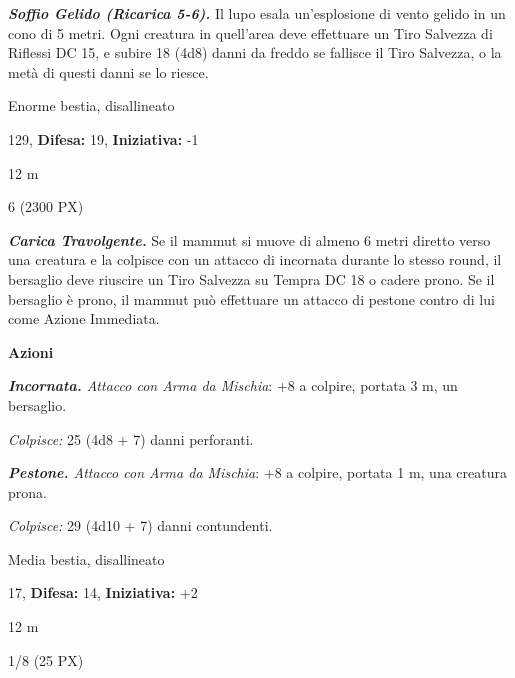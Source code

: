 \begin{multicols}{2}
{\emph{\textbf{Soffio Gelido (Ricarica 5-6).}} Il lupo esala un'esplosione di vento gelido in un cono di 5 metri. Ogni creatura in quell'area deve effettuare un Tiro Salvezza di Riflessi DC 15, e subire 18 (4d8) danni da freddo se fallisce il Tiro Salvezza, o la metà di questi danni se lo riesce.

\begin{description}[noitemsep, topsep=0pt, parsep=0pt, partopsep=0pt, leftmargin=0cm, labelwidth=2.2cm]
    \item[\textbf{Taglia/Tipo:}] Enorme bestia, disallineato
    \item[\textbf{Caratt.:}] 
    \item[\textbf{Punti Ferita:}] 129,  \textbf{Difesa:} 19,  \textbf{Iniziativa:} -1
    \item[\textbf{Tiri Salvez.:}] 
    \item[\textbf{Movimento:}] 12 m
    \item[\textbf{Sfida:}] 6 (2300 PX)\smallskip
\end{description}

\emph{\textbf{Carica Travolgente.}} Se il mammut si muove di almeno 6 metri diretto verso una creatura e la colpisce con un attacco di incornata durante lo stesso round, il bersaglio deve riuscire un Tiro Salvezza su Tempra DC 18 o cadere prono. Se il bersaglio è prono, il mammut può effettuare un attacco di pestone contro di lui come Azione Immediata.

\textbf{Azioni}

\emph{\textbf{Incornata.} Attacco con Arma da Mischia}: +8 a colpire, portata 3 m, un bersaglio.

\emph{Colpisce:} 25 (4d8 + 7) danni perforanti.

\emph{\textbf{Pestone.} Attacco con Arma da Mischia}: +8 a colpire, portata 1 m, una creatura prona.

\emph{Colpisce:} 29 (4d10 + 7) danni contundenti.

\begin{description}[noitemsep, topsep=0pt, parsep=0pt, partopsep=0pt, leftmargin=0cm, labelwidth=2.2cm]
    \item[\textbf{Taglia/Tipo:}] Media bestia, disallineato
    \item[\textbf{Caratt.:}] 
    \item[\textbf{Punti Ferita:}] 17,  \textbf{Difesa:} 14,  \textbf{Iniziativa:} +2
    \item[\textbf{Tiri Salvez.:}] 
    \item[\textbf{Movimento:}] 12 m
    \item[\textbf{Sfida:}] 1/8 (25 PX)\smallskip
\end{description}

}
\end{multicols}
